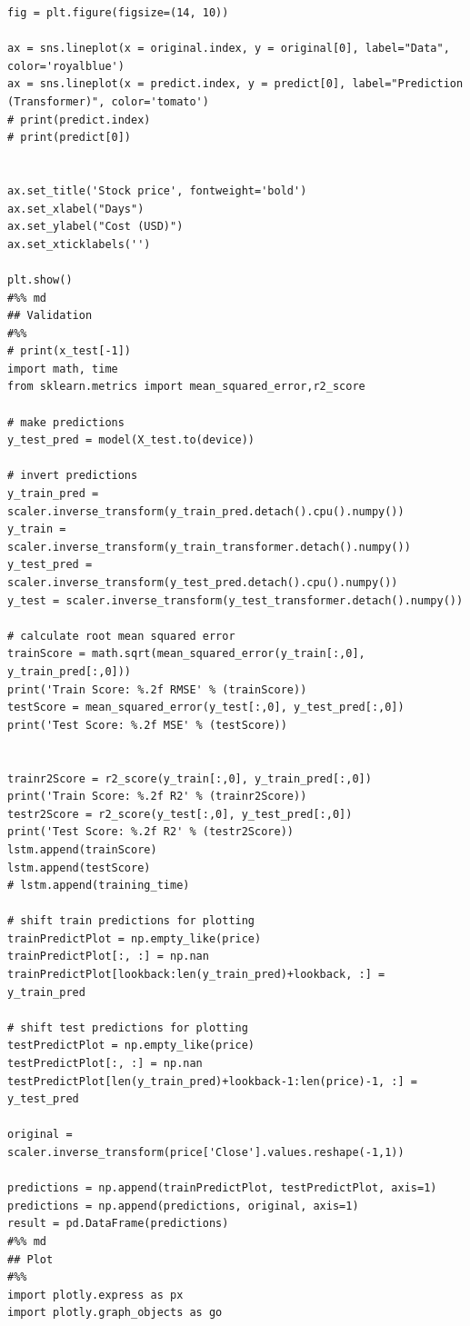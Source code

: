 \documentclass[stu,12pt,floatsintext]{apa7}
\begin{document}
\begin{verbatim}
fig = plt.figure(figsize=(14, 10))

ax = sns.lineplot(x = original.index, y = original[0], label="Data", color='royalblue')
ax = sns.lineplot(x = predict.index, y = predict[0], label="Prediction (Transformer)", color='tomato')
# print(predict.index)
# print(predict[0])


ax.set_title('Stock price', fontweight='bold')
ax.set_xlabel("Days")
ax.set_ylabel("Cost (USD)")
ax.set_xticklabels('')

plt.show()
#%% md
## Validation
#%%
# print(x_test[-1])
import math, time
from sklearn.metrics import mean_squared_error,r2_score

# make predictions
y_test_pred = model(X_test.to(device))

# invert predictions
y_train_pred = scaler.inverse_transform(y_train_pred.detach().cpu().numpy())
y_train = scaler.inverse_transform(y_train_transformer.detach().numpy())
y_test_pred = scaler.inverse_transform(y_test_pred.detach().cpu().numpy())
y_test = scaler.inverse_transform(y_test_transformer.detach().numpy())

# calculate root mean squared error
trainScore = math.sqrt(mean_squared_error(y_train[:,0], y_train_pred[:,0]))
print('Train Score: %.2f RMSE' % (trainScore))
testScore = mean_squared_error(y_test[:,0], y_test_pred[:,0])
print('Test Score: %.2f MSE' % (testScore))


trainr2Score = r2_score(y_train[:,0], y_train_pred[:,0])
print('Train Score: %.2f R2' % (trainr2Score))
testr2Score = r2_score(y_test[:,0], y_test_pred[:,0])
print('Test Score: %.2f R2' % (testr2Score))
lstm.append(trainScore)
lstm.append(testScore)
# lstm.append(training_time)

# shift train predictions for plotting
trainPredictPlot = np.empty_like(price)
trainPredictPlot[:, :] = np.nan
trainPredictPlot[lookback:len(y_train_pred)+lookback, :] = y_train_pred

# shift test predictions for plotting
testPredictPlot = np.empty_like(price)
testPredictPlot[:, :] = np.nan
testPredictPlot[len(y_train_pred)+lookback-1:len(price)-1, :] = y_test_pred

original = scaler.inverse_transform(price['Close'].values.reshape(-1,1))

predictions = np.append(trainPredictPlot, testPredictPlot, axis=1)
predictions = np.append(predictions, original, axis=1)
result = pd.DataFrame(predictions)
#%% md
## Plot
#%%
import plotly.express as px
import plotly.graph_objects as go


\end{verbatim}
\end{document}
